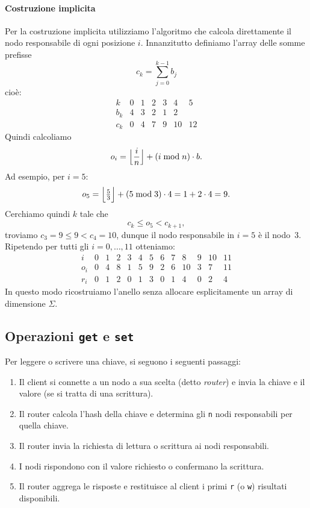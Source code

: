 \paragraph{Costruzione implicita}
Per la costruzione implicita utilizziamo l'algoritmo che calcola direttamente il nodo responsabile di ogni posizione \(i\). Innanzitutto definiamo l'array delle somme prefisse
\[
    c_k = \sum_{j=0}^{k-1} b_j
\]
cioè:
\[
    \begin{array}{c|cccccc}
        k   & 0 & 1 & 2 & 3 & 4 & 5\\\hline
        b_k & 4 & 3 & 2 & 1 & 2 & \\\hline
        c_k & 0 & 4 & 7 & 9 & 10 & 12
    \end{array}
\]
Quindi calcoliamo
\[
    o_i = \Bigl\lfloor \frac{i}{n} \Bigr\rfloor + (i \bmod n) \cdot b.
\]
Ad esempio, per \(i = 5\):
\[
    o_5 = \Bigl\lfloor \tfrac{5}{3} \Bigr\rfloor + (5 \bmod 3) \cdot 4 = 1 + 2\cdot4 = 9.
\]
Cerchiamo quindi \(k\) tale che
\[
    c_k \le o_5 < c_{k+1},
\]
troviamo \(c_3 = 9 \le 9 < c_4 = 10\), dunque il nodo responsabile in \(i=5\) è il nodo~3.
Ripetendo per tutti gli \(i=0,\dots,11\) otteniamo:
\[
    \begin{array}{c|cccccccccccc}
        i   & 0 & 1 & 2 & 3 & 4 & 5 & 6 & 7 & 8 & 9 & 10 & 11\\\hline
        o_i & 0 & 4 & 8 & 1 & 5 & 9 & 2 & 6 & 10 & 3 & 7 & 11\\\hline
        r_i & 0 & 1 & 2 & 0 & 1 & 3 & 0 & 1 & 4 & 0 & 2 & 4
    \end{array}
\]
In questo modo ricostruiamo l'anello senza allocare esplicitamente un array di dimensione \(\Sigma\).

\subsection{Operazioni \texttt{get} e \texttt{set}}
\label{subsec:get-set}

Per leggere o scrivere una chiave, si seguono i seguenti passaggi:
\begin{enumerate}
    \item Il client si connette a un nodo a sua scelta (detto \emph{router}) e invia la chiave e il valore (se si tratta di una scrittura).
    \item Il router calcola l'hash della chiave e determina gli \texttt{n} nodi responsabili per quella chiave.
    \item Il router invia la richiesta di lettura o scrittura ai nodi responsabili.
    \item I nodi rispondono con il valore richiesto o confermano la scrittura.
    \item Il router aggrega le risposte e restituisce al client i primi \texttt{r} (o \texttt{w}) risultati disponibili.
\end{enumerate}

